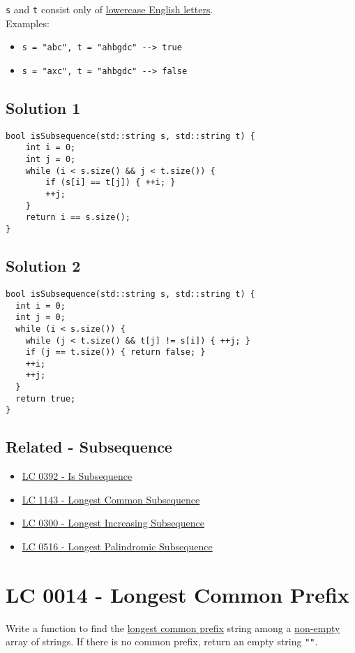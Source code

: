 {\colorbox{CodeBackground}{\lstinline|s|}} and {\colorbox{CodeBackground}{\lstinline|t|}} consist only of \ul{lowercase English letters}.\\

Examples:
\begin{itemize}
	\item {\colorbox{CodeBackground}{\lstinline|s = "abc", t = "ahbgdc" --> true|}}
	\item {\colorbox{CodeBackground}{\lstinline|s = "axc", t = "ahbgdc" --> false|}}
\end{itemize}

\subsection*{Solution 1}
\begin{lstlisting}
bool isSubsequence(std::string s, std::string t) {
	int i = 0;
	int j = 0;
	while (i < s.size() && j < t.size()) {
		if (s[i] == t[j]) { ++i; }
		++j;
	}
	return i == s.size();
}
\end{lstlisting}

\subsection*{Solution 2}
\begin{lstlisting}
bool isSubsequence(std::string s, std::string t) {
  int i = 0;
  int j = 0;
  while (i < s.size()) {
    while (j < t.size() && t[j] != s[i]) { ++j; }
    if (j == t.size()) { return false; }
    ++i;
    ++j;
  }
  return true;
}
\end{lstlisting}

\subsection*{Related - Subsequence}
\begin{itemize}
	\item \hyperref[lc0392]{LC 0392 - Is Subsequence}
	\item \hyperref[lc1143]{LC 1143 - Longest Common Subsequence}
	\item \hyperref[lc0300]{LC 0300 - Longest Increasing Subsequence}
	\item \hyperref[lc0516]{LC 0516 - Longest Palindromic Subsequence}
\end{itemize}

\section{LC 0014 - Longest Common Prefix}
Write a function to find the \ul{longest common prefix} string among a \ul{non-empty} array of strings. If there is no common prefix, return an empty string {\colorbox{CodeBackground}{\lstinline|""|}}.\\

